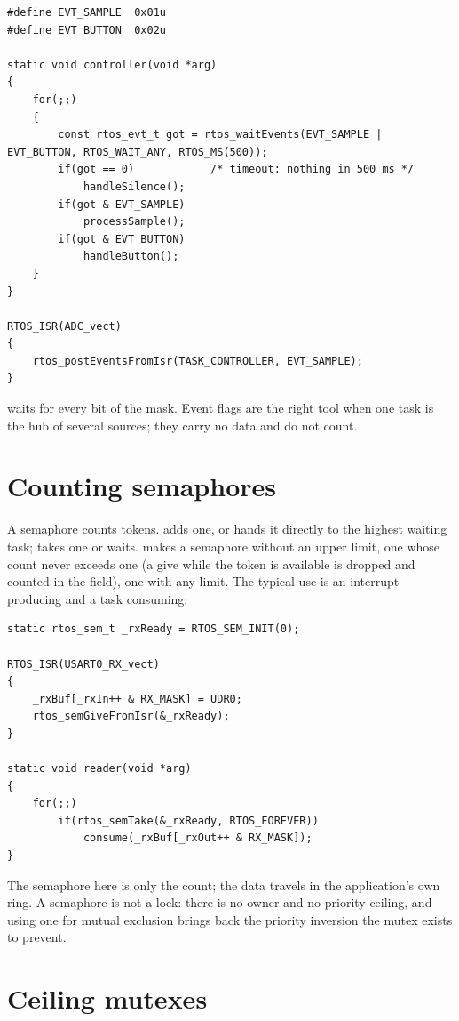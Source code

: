 \begin{lstlisting}
#define EVT_SAMPLE  0x01u
#define EVT_BUTTON  0x02u

static void controller(void *arg)
{
    for(;;)
    {
        const rtos_evt_t got = rtos_waitEvents(EVT_SAMPLE | EVT_BUTTON, RTOS_WAIT_ANY, RTOS_MS(500));
        if(got == 0)            /* timeout: nothing in 500 ms */
            handleSilence();
        if(got & EVT_SAMPLE)
            processSample();
        if(got & EVT_BUTTON)
            handleButton();
    }
}

RTOS_ISR(ADC_vect)
{
    rtos_postEventsFromIsr(TASK_CONTROLLER, EVT_SAMPLE);
}
\end{lstlisting}

 waits for every bit of the mask. Event flags are the right tool
when one task is the hub of several sources; they carry no data and do not count.

\section{Counting semaphores}

A semaphore counts tokens.  adds one, or hands it directly to the
highest waiting task;  takes one or waits. 
makes a semaphore without an upper limit,  one whose
count never exceeds one (a give while the token is available is dropped and counted in
the  field),  one with any limit. The
typical use is an interrupt producing and a task consuming:

\begin{lstlisting}
static rtos_sem_t _rxReady = RTOS_SEM_INIT(0);

RTOS_ISR(USART0_RX_vect)
{
    _rxBuf[_rxIn++ & RX_MASK] = UDR0;
    rtos_semGiveFromIsr(&_rxReady);
}

static void reader(void *arg)
{
    for(;;)
        if(rtos_semTake(&_rxReady, RTOS_FOREVER))
            consume(_rxBuf[_rxOut++ & RX_MASK]);
}
\end{lstlisting}

The semaphore here is only the count; the data travels in the application's own ring. A
semaphore is not a lock: there is no owner and no priority ceiling, and using one for
mutual exclusion brings back the priority inversion the mutex exists to prevent.

\section{Ceiling mutexes}


